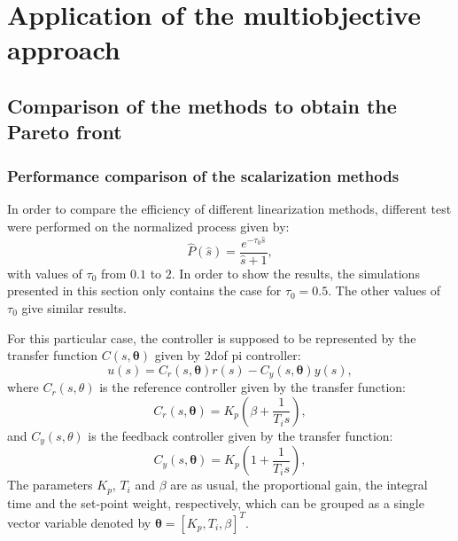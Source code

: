 \chapter{Application of the multiobjective approach}
\label{chap:ApplicationExamplesNoGUI}


\section{Comparison of the methods to obtain the Pareto front}
\label{sec:Comparison}
\subsection{Performance comparison of the scalarization methods}
In order to compare the efficiency of different linearization methods, different test were performed on the normalized process given by:
%
\begin{equation}
\hat{P}(\hat{s}) = \frac{e^{-\tau_0 \hat{s}}}{\hat{s}+1},
\label{eq:NormP}
\end{equation}
%
with values of $\tau_0$ from $0.1$ to $2$. In order to show the results, the simulations presented in this section only contains the case for $\tau_0=0.5$. The other values of $\tau_0$ give similar results.

For this particular case, the controller is supposed to be represented by the transfer function $C(s,\bm{\theta})$ given by \gls{2dof} \gls{pi} controller:
\begin{equation}
u(s) = C_r(s,\bm{\theta}) r(s) - C_y(s,\bm{\theta}) y(s),
\label{eq:2PIControl}
\end{equation}
where $C_r(s,\theta)$ is the reference controller given by the transfer function:
\begin{equation}
C_r(s,\bm{\theta})= K_p \left(\beta + \frac{1}{T_i s} \right),
\label{eq:CrControl}
\end{equation}
%
and $C_y(s,\theta)$ is the feedback controller given by the transfer function:
\begin{equation}
C_y(s,\bm{\theta})=K_p \left(1 + \frac{1}{T_i s} \right),
\label{eq:CyControl}
\end{equation}
%
The parameters $K_p$, $T_i$ and $\beta$ are as usual, the proportional gain, the integral time and the set-point weight, respectively, which can be grouped as a single vector variable denoted by $\bm{\theta}=\left[K_p,T_i,\beta\right]^{T}$.


